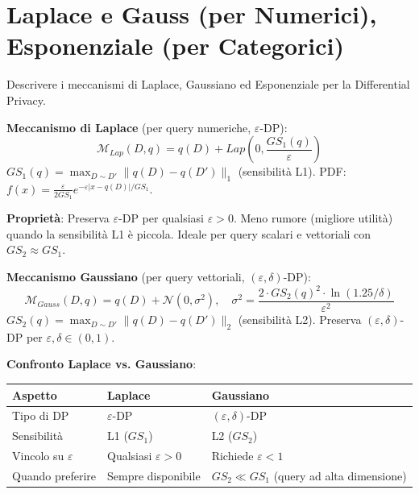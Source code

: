 \documentclass[a4paper,11pt]{article}
\begin{document}
\section{Laplace e Gauss (per Numerici), Esponenziale (per Categorici)}

\begin{domanda}
Descrivere i meccanismi di Laplace, Gaussiano ed Esponenziale per la Differential Privacy.
\end{domanda}

\textbf{Meccanismo di Laplace} (per query numeriche, $\varepsilon$-DP):
\[
\mathcal{M}_{Lap}(D, q) = q(D) + Lap\!\left(0, \frac{GS_1(q)}{\varepsilon}\right)
\]
$GS_1(q) = \max_{D \sim D'} \|q(D) - q(D')\|_1$ (sensibilit\`{a} L1). PDF: $f(x) = \frac{\varepsilon}{2 GS_1} e^{-\varepsilon|x-q(D)|/GS_1}$.

\textbf{Propriet\`{a}}: Preserva $\varepsilon$-DP per qualsiasi $\varepsilon > 0$. Meno rumore (migliore utilit\`{a}) quando la sensibilit\`{a} L1 \`{e} piccola. Ideale per query scalari e vettoriali con $GS_2 \approx GS_1$.

\textbf{Meccanismo Gaussiano} (per query vettoriali, $(\varepsilon, \delta)$-DP):
\[
\mathcal{M}_{Gauss}(D, q) = q(D) + \mathcal{N}(0, \sigma^2), \quad \sigma^2 = \frac{2 \cdot GS_2(q)^2 \cdot \ln(1.25/\delta)}{\varepsilon^2}
\]
$GS_2(q) = \max_{D \sim D'} \|q(D) - q(D')\|_2$ (sensibilit\`{a} L2). Preserva $(\varepsilon, \delta)$-DP per $\varepsilon, \delta \in (0, 1)$.

\textbf{Confronto Laplace vs. Gaussiano}:
\begin{center}
\begin{tabular}{lll}
\toprule
\textbf{Aspetto} & \textbf{Laplace} & \textbf{Gaussiano} \\
\midrule
Tipo di DP & $\varepsilon$-DP & $(\varepsilon, \delta)$-DP \\
Sensibilit\`{a} & L1 ($GS_1$) & L2 ($GS_2$) \\
Vincolo su $\varepsilon$ & Qualsiasi $\varepsilon > 0$ & Richiede $\varepsilon < 1$ \\
Quando preferire & Sempre disponibile & $GS_2 \ll GS_1$ (query ad alta dimensione) \\
\bottomrule
\end{tabular}
\end{center}
\end{document}
